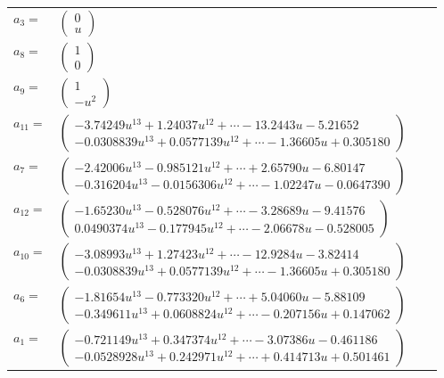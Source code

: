 \documentclass[1p]{elsarticle_modified}
\theoremstyle{definition}
\begin{document}
\begin{tabular}{m{7pt} m{180pt} m{7pt} m{180pt} }
\flushright $a_{3}=$&$\begin{pmatrix}0\\u\end{pmatrix}$ \\
\flushright $a_{8}=$&$\begin{pmatrix}1\\0\end{pmatrix}$ \\
\flushright $a_{9}=$&$\begin{pmatrix}1\\- u^2\end{pmatrix}$ \\
\flushright $a_{11}=$&$\begin{pmatrix}-3.74249 u^{13}+1.24037 u^{12}+\cdots-13.2443 u-5.21652\\-0.0308839 u^{13}+0.0577139 u^{12}+\cdots-1.36605 u+0.305180\end{pmatrix}$ \\
\flushright $a_{7}=$&$\begin{pmatrix}-2.42006 u^{13}-0.985121 u^{12}+\cdots+2.65790 u-6.80147\\-0.316204 u^{13}-0.0156306 u^{12}+\cdots-1.02247 u-0.0647390\end{pmatrix}$ \\
\flushright $a_{12}=$&$\begin{pmatrix}-1.65230 u^{13}-0.528076 u^{12}+\cdots-3.28689 u-9.41576\\0.0490374 u^{13}-0.177945 u^{12}+\cdots-2.06678 u-0.528005\end{pmatrix}$ \\
\flushright $a_{10}=$&$\begin{pmatrix}-3.08993 u^{13}+1.27423 u^{12}+\cdots-12.9284 u-3.82414\\-0.0308839 u^{13}+0.0577139 u^{12}+\cdots-1.36605 u+0.305180\end{pmatrix}$ \\
\flushright $a_{6}=$&$\begin{pmatrix}-1.81654 u^{13}-0.773320 u^{12}+\cdots+5.04060 u-5.88109\\-0.349611 u^{13}+0.0608824 u^{12}+\cdots-0.207156 u+0.147062\end{pmatrix}$ \\
\flushright $a_{1}=$&$\begin{pmatrix}-0.721149 u^{13}+0.347374 u^{12}+\cdots-3.07386 u-0.461186\\-0.0528928 u^{13}+0.242971 u^{12}+\cdots+0.414713 u+0.501461\end{pmatrix}$ \\

\end{tabular}
\end{document}
